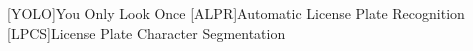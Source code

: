 [YOLO]{You Only Look Once}
[ALPR]{Automatic License Plate Recognition}
[LPCS]{License Plate Character Segmentation}
